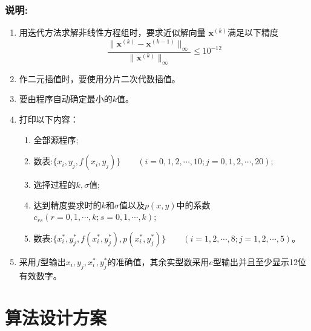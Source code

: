 \subsection*{说明:}
\begin{enumerate}
\item 用迭代方法求解非线性方程组时，要求近似解向量
${\bm{x}^{(k)}}$满足以下精度
\[\dfrac{\|{\bm{x}^{(k)}} - {\bm{x}^{(k - 1)}}\|_{\infty }}{\|{\bm{x}^{(k)}}\|_{\infty }} \le {10^{ - 12}}\]

\item 作二元插值时，要使用分片二次代数插值。

\item 要由程序自动确定最小的$k$值。

\item 打印以下内容：

\begin{enumerate}
\item 全部源程序;

\item 数表:$\{{x_i},{y_j},f({x_i},{y_j})\}\qquad (i = 0,1,2,\cdots,10;j = 0,1,2,\cdots,20)$;

\item 选择过程的$k,\sigma$值;

\item 达到精度要求时的$k$和$\sigma$值以及$p(x,y)$中的系数
$c_{rs}(r = 0,1,\cdots,k;s = 0,1,\cdots,k)$;

\item 数表:$\{x_i^{\ast},y_j^{\ast},f(x_i^{\ast},y_j^{\ast}),p(x_i^{\ast},y_j^{\ast})\}\qquad (i = 1, 2,\cdots,8;j = 1,2,\cdots,5)$。

\end{enumerate}
\item 采用$f$型输出$x_i,y_j,x_i^{\ast},y_j^{\ast}$的准确值，其余实型数采用$e$型输出并且至少显示12位有效数字。
\end{enumerate}


\newpage
\chapter{算法设计方案}
